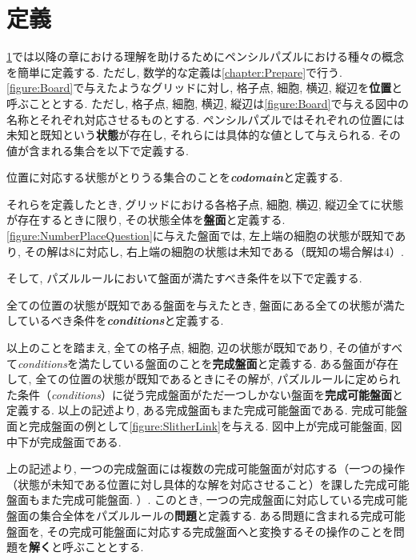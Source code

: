 \section{定義}\label{section:IntroDefinition}
\cref{section:IntroDefinition}では以降の章における理解を助けるためにペンシルパズルにおける種々の概念を簡単に定義する. ただし, 数学的な定義は\cref{chapter:Prepare}で行う. \cref{figure:Board}で与えたようなグリッドに対し, 格子点, 細胞, 横辺, 縦辺を\textbf{位置}と呼ぶこととする. ただし, 格子点, 細胞, 横辺, 縦辺は\cref{figure:Board}で与える図中の名称とそれぞれ対応させるものとする. ペンシルパズルではそれぞれの位置には未知と既知という\textbf{状態}が存在し, それらには具体的な値として与えられる. その値が含まれる集合を以下で定義する.
\begin{definition}
  位置に対応する状態がとりうる集合のことを\textbf{\textit{codomain}}と定義する.
\end{definition}
それらを定義したとき, グリッドにおける各格子点, 細胞, 横辺, 縦辺全てに状態が存在するときに限り, その状態全体を\textbf{盤面}と定義する. \cref{figure:NumberPlaceQuestion}に与えた盤面では, 左上端の細胞の状態が既知であり, その解は8に対応し, 右上端の細胞の状態は未知である（既知の場合解は4）.

そして, パズルルールにおいて盤面が満たすべき条件を以下で定義する.
\begin{definition}
  全ての位置の状態が既知である盤面を与えたとき, 盤面にある全ての状態が満たしているべき条件を\textbf{\textit{conditions}}と定義する.
\end{definition}

以上のことを踏まえ, 全ての格子点, 細胞, 辺の状態が既知であり, その値がすべて\textit{conditions}を満たしている盤面のことを\textbf{完成盤面}と定義する. ある盤面が存在して, 全ての位置の状態が既知であるときにその解が, パズルルールに定められた条件（\textit{conditions}）に従う完成盤面がただ一つしかない盤面を\textbf{完成可能盤面}と定義する. 以上の記述より, ある完成盤面もまた完成可能盤面である. 完成可能盤面と完成盤面の例として\cref{figure:SlitherLink}を与える. 図中上が完成可能盤面, 図中下が完成盤面である.

上の記述より, 一つの完成盤面には複数の完成可能盤面が対応する（一つの操作（状態が未知である位置に対し具体的な解を対応させること）を課した完成可能盤面もまた完成可能盤面. ）. このとき, 一つの完成盤面に対応している完成可能盤面の集合全体をパズルルールの\textbf{問題}と定義する. ある問題に含まれる完成可能盤面を, その完成可能盤面に対応する完成盤面へと変換するその操作のことを問題を\textbf{解く}と呼ぶこととする.


